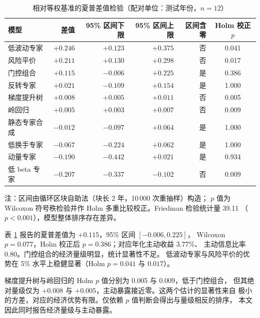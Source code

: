 \begin{table}[htbp]
\centering
\caption{相对等权基准的夏普差值检验（配对单位：测试年份，$n=12$）}
\label{tab:signif}
\begin{threeparttable}
\footnotesize
\begin{tabular}{lrrrrc}
\toprule
模型 & 差值 & 95\% 区间下限 & 95\% 区间上限 & 区间含零 & Holm 校正 $p$ \\
\midrule
低波动专家 & $+0.246$ & $+0.123$ & $+0.375$ & 否 & 0.041 \\
风险平价 & $+0.211$ & $+0.130$ & $+0.298$ & 否 & 0.017 \\
门控组合 & $+0.115$ & $-0.006$ & $+0.225$ & 是 & 0.386 \\
反转专家 & $+0.021$ & $-0.109$ & $+0.154$ & 是 & 1.000 \\
梯度提升树 & $+0.008$ & $+0.005$ & $+0.011$ & 否 & 0.005 \\
岭回归 & $+0.005$ & $+0.003$ & $+0.007$ & 否 & 0.009 \\
静态专家合成 & $-0.012$ & $-0.097$ & $+0.064$ & 是 & 1.000 \\
低换手专家 & $-0.067$ & $-0.224$ & $+0.062$ & 是 & 1.000 \\
动量专家 & $-0.190$ & $-0.442$ & $+0.021$ & 是 & 0.934 \\
低 beta 专家 & $-0.207$ & $-0.337$ & $-0.102$ & 否 & 0.009 \\
\bottomrule
\end{tabular}
\begin{tablenotes}[flushleft]\footnotesize
\item 注：区间由循环区块自助法（块长 2 年，10\,000 次重抽样）构造；
$p$ 值为 Wilcoxon 符号秩检验并作 Holm 多重比较校正。Friedman 检验统计量 39.11
（$p<0.001$），模型整体排序存在差异。
\end{tablenotes}
\end{threeparttable}
\end{table}

表 \ref{tab:signif} 报告的夏普差值为 $+0.115$，95\% 区间 $[-0.006,0.225]$，
Wilcoxon $p=0.077$，Holm 校正后 $p=0.386$；对应年化主动收益 3.77\%、
主动信息比率 0.80。门控组合的经济量级明显，统计显著性不足。
低波动专家与风险平价的优势在 5\% 水平上稳健显著（Holm $p=0.041$ 与 $0.017$）。

梯度提升树与岭回归的 Holm $p$ 值分别为 0.005 与 0.009，低于门控组合，
但其绝对量级仅为 $+0.008$ 与 $+0.005$，主动暴露接近零。这两个估计的显著性来自
极小的方差，对应的经济优势有限。仅依赖 $p$ 值判断会得出与量级相反的排序，
本文因此同时报告经济量级与主动暴露。


